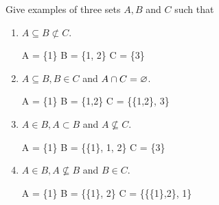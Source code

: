 \documentclass{homework}
\begin{document}
\question Give examples of three sets $A, B$ and $C$ such that
\begin{enumerate}[label=(\alph*)]
    \item $A \subseteq B \not\subset C$.

    \begin{sol}
        A = \{1\} \smallbreak
        B = \{1, 2\} \smallbreak
        C = \{3\} \smallbreak
    \end{sol}
    
    \item $A \subseteq B, B \in C$ and $A \cap C = \varnothing$.

    \begin{sol}
        A = \{1\} \smallbreak
        B = \{1,2\} \smallbreak
        C = \{\{1,2\}, 3\} \smallbreak
    \end{sol}
    
    \item $A \in B, A \subset B$ and $A \not\subseteq C$.

    \begin{sol}
        A = \{1\} \smallbreak
        B = \{\{1\}, 1, 2\} \smallbreak
        C = \{3\} \smallbreak
    \end{sol}
    
    \item $A \in B, A \not\subseteq B$ and $B \in C$.

    \begin{sol}
        A = \{1\} \smallbreak
        B = \{\{1\}, 2\} \smallbreak
        C = \{\{\{1\},2\}, 1\} \smallbreak
    \end{sol}
\end{enumerate}
\end{document}
